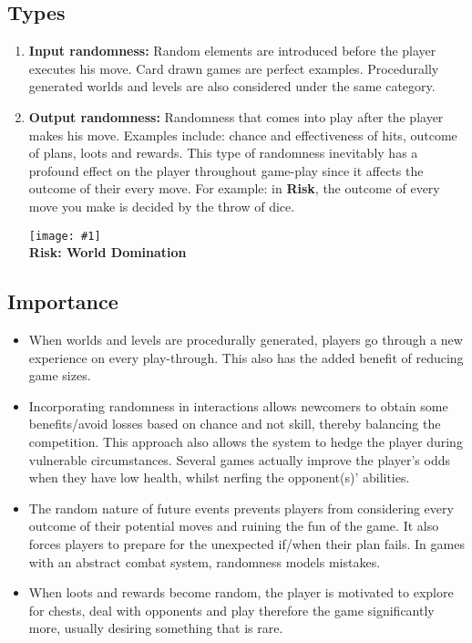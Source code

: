 \documentclass[12pt]{article}
\newcommand{\point}[1]{\item \textbf{#1:}}
\newcommand{\fig}[3]{\begin{center} \texttt{[image: \#1]}\\ \textbf{#3} \end{center}}
\begin{document}
\subsection{Types}

\begin{enumerate}[1.]

\point{Input randomness} Random elements are introduced before the player executes his move. Card drawn games are perfect examples. Procedurally generated worlds and levels are also considered under the same category.

\point{Output randomness} Randomness that comes into play after the player makes his move. Examples include: chance and effectiveness of hits, outcome of plans, loots and rewards. This type of randomness inevitably has a profound effect on the player throughout game-play since it affects the outcome of their every move. For example: in \textbf{Risk}, the outcome of every move you make is decided by the throw of dice. 

\fig{risk.jpg}{0.5}{Risk: World Domination}

\end{enumerate}

\subsection{Importance}

\begin{itemize}

\item When worlds and levels are procedurally generated, players go through a new experience on every play-through. This also has the added benefit of reducing game sizes. 

\item Incorporating randomness in interactions allows newcomers to obtain some benefits/avoid losses based on chance and not skill, thereby balancing the competition. This approach also allows the system to hedge the player during vulnerable circumstances. Several games actually improve the player's odds when they have low health, whilst nerfing the opponent(s)' abilities.

\item The random nature of future events prevents players from considering every outcome of their potential moves and ruining the fun of the game. It also forces players to prepare for the unexpected if/when their plan fails. In games with an abstract combat system, randomness models mistakes.

\item When loots and rewards become random, the player is motivated to explore for chests, deal with opponents and play therefore the game significantly more, usually desiring something that is rare.

\end{itemize}
\end{document}
